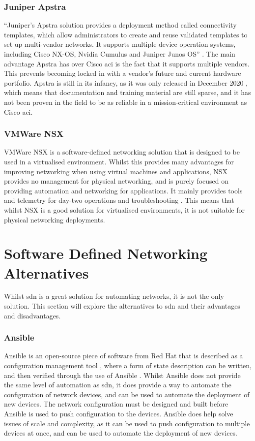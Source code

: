 \subsubsection{Juniper Apstra}
``Juniper’s Apstra solution provides
a
deployment method called connectivity templates, which allow administrators to
create and reuse validated templates to set up multi-vendor networks. It
supports multiple device operation systems, including Cisco NX-OS, Nvidia
Cumulus and Juniper Junos OS'' \citep{9914530}. The main advantage Apstra has over Cisco
\gls{aci} is the fact that it supports multiple vendors. This prevents becoming locked in with a vendor's future and current hardware portfolio. Apstra is still in its
infancy, as it was only released in December 2020 \citep{9914530}, which means
that documentation and training material are still sparse, and it has not been
proven in the field to be as reliable in a mission-critical environment as
Cisco \gls{aci}.

\subsubsection{VMWare NSX}
VMWare NSX is a software-defined
networking solution that is designed to be used in a virtualised environment.
Whilst this provides many advantages for improving networking when using
virtual machines and applications, NSX provides no management for physical
networking, and is purely focused on providing automation and networking for
applications. It mainly provides tools and telemetry for day-two operations and
troubleshooting \citep{2}. This means that whilst NSX is a good solution for
virtualised environments, it is not suitable for physical networking
deployments.

\section{Software Defined Networking Alternatives}
\label{litreview:alternatives}
Whilst \gls{sdn} is a great
solution for
automating networks, it is not the only solution. This section
will explore the
alternatives to \gls{sdn} and their advantages and
disadvantages.
\subsubsection{Ansible}
Ansible is an open-source piece of software from Red
Hat that is described as a configuration management tool \citep{4}, where a form of state
description can be written, and then verified through the use of Ansible
\citep{powerofansible}. Whilst Ansible does not provide the same level of
automation as \gls{sdn}, it does provide a way to automate the configuration of
network devices, and can be used to automate the deployment of new devices. The
network configuration must be designed and built before Ansible is used to push
configuration to the devices. Ansible does help solve issues of scale and
complexity, as it can be used to push configuration to multiple devices at
once, and can be used to automate the deployment of new devices.


